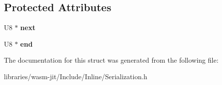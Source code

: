 \subsection*{Protected Attributes}
\begin{DoxyCompactItemize}
\item 
\mbox{\label{struct_serialization_1_1_output_stream_a6b5f479d5d7ca4a5c0a43607cfebe8e3}} 
U8 $\ast$ {\bfseries next}
\item 
\mbox{\label{struct_serialization_1_1_output_stream_a10ed33bdcaa84aa831c7ff09808d9a68}} 
U8 $\ast$ {\bfseries end}
\end{DoxyCompactItemize}


The documentation for this struct was generated from the following file\+:\begin{DoxyCompactItemize}
\item 
libraries/wasm-\/jit/\+Include/\+Inline/Serialization.\+h\end{DoxyCompactItemize}
